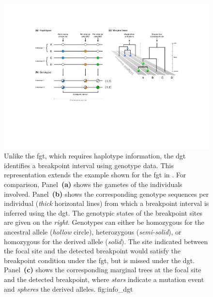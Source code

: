 

\begin{figure}[!htb]
\centering
\includegraphics[width=\textwidth]{./img/ch3/info_dgt_new}
{Unlike the \gls{fgt}, which requires haplotype information, the \gls{dgt} identifies a breakpoint interval using genotype data.
This representation extends the example shown for the \gls{fgt} in .
For comparison, Panel~\textbf{(a)} shows the  gametes of the  individuals involved.
Panel~\textbf{(b)} shows the  corresponding genotype sequences per individual (\emph{thick} horizontal lines) from which a breakpoint interval is inferred using the \gls{dgt}.
The genotypic states of the breakpoint sites are given on the \emph{right}.
Genotypes can either be homozygous for the ancestral allele (\emph{hollow} circle), heterozygous (\emph{semi-solid}), or homozygous for the derived allele (\emph{solid}).
The site indicated between the focal site and the detected breakpoint would satisfy the breakpoint condition under the \gls{fgt}, but is missed under the \gls{dgt}.
Panel~\textbf{(c)} shows the corresponding marginal trees at the focal site and the detected breakpoint, where \emph{stars} indicate a mutation event and \emph{spheres} the derived alleles.}
{fig:info_dgt}
\end{figure}
